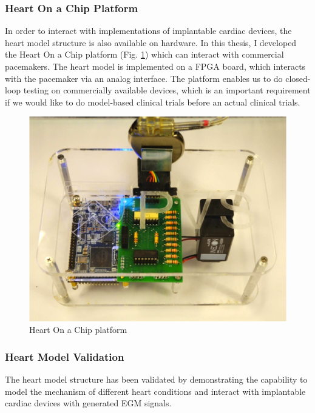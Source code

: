 \documentclass[a4paper]{article}
\begin{document}
\subsubsection{Heart On a Chip Platform}
In order to interact with implementations of implantable cardiac devices, the heart model structure is also available on hardware. 
In this thesis, I developed the Heart On a Chip platform (Fig. \ref{fig:HOC}) which can interact with commercial pacemakers.
The heart model is implemented on a FPGA board, which interacts with the pacemaker via an analog interface.
The platform enables us to do closed-loop testing on commercially available devices, which is an important requirement if we would like to do model-based clinical trials before an actual clinical trials.
\begin{figure}[t]
	\centering
	\includegraphics[scale=0.55]{figs/HOC.png}
	\caption{\small Heart On a Chip platform}
	\label{fig:HOC}
\end{figure}
\subsubsection{Heart Model Validation}
The heart model structure has been validated by demonstrating the capability to model the mechanism of different heart conditions and interact with implantable cardiac devices with generated EGM signals.
\end{document}
